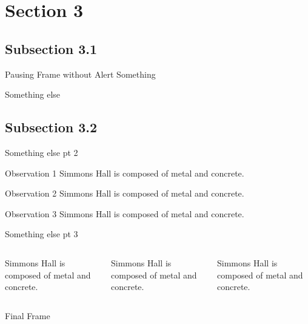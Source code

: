 \documentclass{beamer}
\begin{document}
\section{Section 3}

\sectionoverview %

\subsection{Subsection 3.1}

\subsectionoverview %

\begin{frame}{Pausing Frame without Alert}
Something
\pause

Something else
\end{frame}

\subsection{Subsection 3.2}
\subsectionoverview %

\begin{frame}{Something else pt 2}
\begin{block}{Observation 1}
Simmons Hall is composed of metal and concrete.
\end{block}
\pause
\begin{block}{Observation 2}
Simmons Hall is composed of metal and concrete.
\end{block}
\pause
\begin{block}{Observation 3}
Simmons Hall is composed of metal and concrete.
\end{block}
\end{frame}

\begin{frame}{Something else pt 3}
\begin{columns}
\begin{column}{0.33\textwidth}
Simmons Hall is composed of metal and concrete.
\end{column}
\begin{column}{0.33\textwidth}
Simmons Hall is composed of metal and concrete.
\end{column}
\begin{column}{0.33\textwidth}
Simmons Hall is composed of metal and concrete.
\end{column}
\end{columns}
\end{frame}

\appendix %

\begin{frame}
    Final Frame
\end{frame}
    
\end{document}
